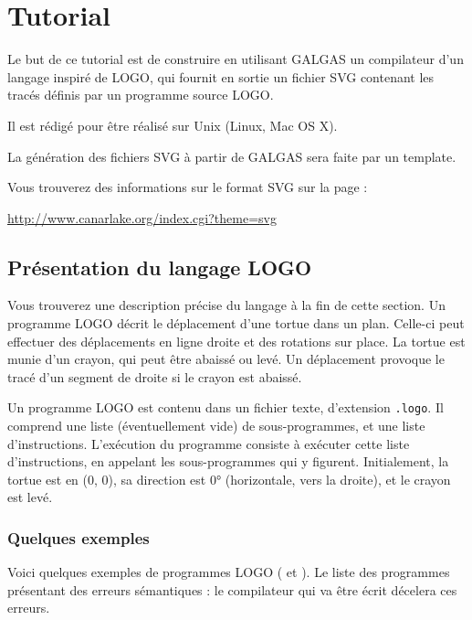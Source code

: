 
\chapter{Tutorial}

Le but de ce tutorial est de construire en utilisant GALGAS un compilateur d’un langage inspiré de LOGO, qui fournit en sortie un fichier SVG contenant les tracés définis par un programme source LOGO.


Il est rédigé pour être réalisé sur Unix (Linux, Mac OS X).

La génération des fichiers SVG à partir de GALGAS sera faite par un template.

Vous trouverez des informations sur le format SVG sur la page :

\url{http://www.canarlake.org/index.cgi?theme=svg}

\section{Présentation du langage LOGO}

Vous trouverez une description précise du langage à la fin de cette section. Un programme LOGO décrit le déplacement d'une tortue dans un plan. Celle-ci peut effectuer des déplacements en ligne droite et des rotations sur place. La tortue est munie d'un crayon, qui peut être abaissé ou levé. Un déplacement provoque le tracé d'un segment de droite si le crayon est abaissé.

Un programme LOGO est contenu dans un fichier texte, d'extension \texttt{.logo}. Il comprend une liste (éventuellement vide) de sous-programmes, et une liste d'instructions. L'exécution du programme consiste à exécuter cette liste d'instructions, en appelant les sous-programmes qui y figurent. Initialement, la tortue est en (0, 0), sa direction est 0° (horizontale, vers la droite), et le crayon est levé.


\subsection{Quelques exemples}

Voici quelques exemples de programmes LOGO ( et ). Le  liste des programmes présentant des erreurs sémantiques : le compilateur qui va être écrit décelera ces erreurs.


